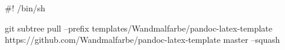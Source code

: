 #!  /bin/sh

git subtree pull --prefix templates/Wandmalfarbe/pandoc-latex-template https://github.com/Wandmalfarbe/pandoc-latex-template master --squash
